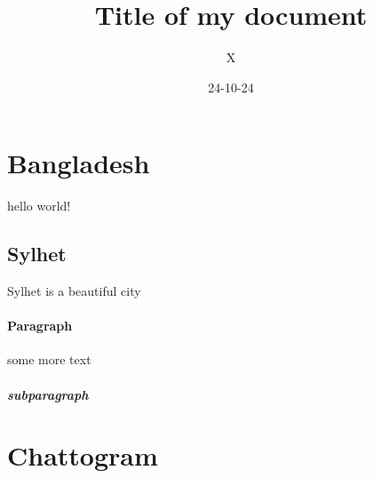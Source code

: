 \documentclass{article}
\title{Title of my document}
\date{24-10-24}
\author{X}
\begin{document}
\maketitle
{}
\newpage
\section{ Bangladesh}
hello world!
\subsection{Sylhet} 
Sylhet is  a beautiful city
\paragraph{Paragraph}
some more text
\subparagraph{subparagraph}
\section{Chattogram}
\end{document}

